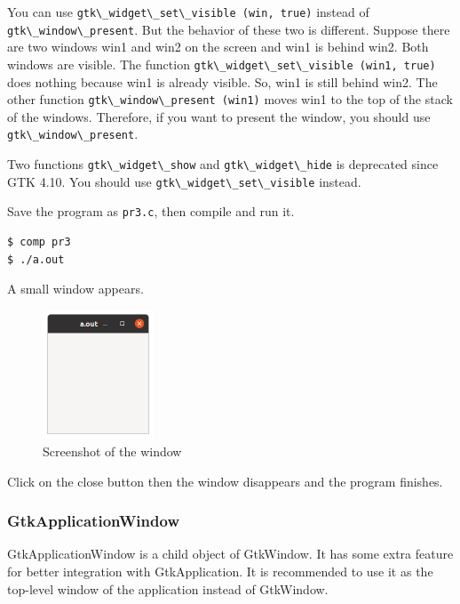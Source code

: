 You can use
\passthrough{\lstinline!gtk\_widget\_set\_visible (win, true)!} instead
of \passthrough{\lstinline!gtk\_window\_present!}. But the behavior of
these two is different. Suppose there are two windows win1 and win2 on
the screen and win1 is behind win2. Both windows are visible. The
function
\passthrough{\lstinline!gtk\_widget\_set\_visible (win1, true)!} does
nothing because win1 is already visible. So, win1 is still behind win2.
The other function \passthrough{\lstinline!gtk\_window\_present (win1)!}
moves win1 to the top of the stack of the windows. Therefore, if you
want to present the window, you should use
\passthrough{\lstinline!gtk\_window\_present!}.

Two functions \passthrough{\lstinline!gtk\_widget\_show!} and
\passthrough{\lstinline!gtk\_widget\_hide!} is deprecated since GTK
4.10. You should use \passthrough{\lstinline!gtk\_widget\_set\_visible!}
instead.

Save the program as \passthrough{\lstinline!pr3.c!}, then compile and
run it.

\begin{lstlisting}
$ comp pr3
$ ./a.out
\end{lstlisting}

A small window appears.

\begin{figure}
\centering
\includegraphics[width=3.3cm,height=3.825cm]{../image/screenshot_pr3.png}
\caption{Screenshot of the window}
\end{figure}

Click on the close button then the window disappears and the program
finishes.

\subsubsection{GtkApplicationWindow}\label{gtkapplicationwindow}

GtkApplicationWindow is a child object of GtkWindow. It has some extra
feature for better integration with GtkApplication. It is recommended to
use it as the top-level window of the application instead of GtkWindow.

